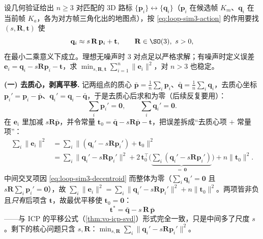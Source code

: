 \begin{derivation}
设几何验证给出 $n\ge 3$ 对匹配的 $3$D 路标 $\{\mathbf p_i\}\leftrightarrow\{\mathbf q_i\}$（$\mathbf p_i$ 在候选帧 $K_m$、$\mathbf q_i$ 在当前帧 $K_a$，各为对方帧三角化出的地图点），按 \cref{eq:loop-sim3-action} 的作用要找 $(s,\mathbf R,\mathbf t)$ 使
\begin{equation}
  \mathbf q_i \approx s\,\mathbf R\,\mathbf p_i+\mathbf t,\qquad \mathbf R\in\SO(3),\ s>0 ,
  \label{eq:loop-sim3-lsq}
\end{equation}
在最小二乘意义下成立。理想无噪声时 $3$ 对点足以严格求解；有噪声时定义误差 $\mathbf e_i=\mathbf q_i-s\mathbf R\mathbf p_i-\mathbf t$，求 $\min_{s,\mathbf R,\mathbf t}\sum_{i=1}^n\lVert\mathbf e_i\rVert^2$，对 $n>3$ 也稳定\cite{horn1987closed}。

\textbf{(一) 去质心，剥离平移.}\;
记两组点的质心 $\bar{\mathbf p}=\tfrac1n\sum_i\mathbf p_i$、$\bar{\mathbf q}=\tfrac1n\sum_i\mathbf q_i$，去质心坐标 $\mathbf p_i'=\mathbf p_i-\bar{\mathbf p}$、$\mathbf q_i'=\mathbf q_i-\bar{\mathbf q}$，于是去质心后求和为零（后续反复要用）：
\begin{equation}
  \sum_i\mathbf p_i'=\mathbf 0,\qquad \sum_i\mathbf q_i'=\mathbf 0 .
  \label{eq:loop-sim3-decentroid}
\end{equation}
在 $\mathbf e_i$ 里加减 $s\mathbf R\bar{\mathbf p}$，并令常量 $\mathbf t_0=\bar{\mathbf q}-s\mathbf R\bar{\mathbf p}-\mathbf t$，把误差拆成“去质心项 $+$ 常量项”：
\begin{equation}
\begin{aligned}
  \sum_i\lVert\mathbf e_i\rVert^2
  &=\sum_i\big\lVert(\mathbf q_i'-s\mathbf R\mathbf p_i')+\mathbf t_0\big\rVert^2\\
  &=\sum_i\lVert\mathbf q_i'-s\mathbf R\mathbf p_i'\rVert^2
   +2\,\mathbf t_0^\top\!\Big(\underbrace{\textstyle\sum_i(\mathbf q_i'-s\mathbf R\mathbf p_i')}_{=\,\mathbf 0}\Big)
   +n\lVert\mathbf t_0\rVert^2 .
\end{aligned}
  \label{eq:loop-sim3-expand}
\end{equation}
中间交叉项因 \cref{eq:loop-sim3-decentroid} 而整体为零（$\sum_i\mathbf q_i'=\mathbf 0$ 且 $s\mathbf R\sum_i\mathbf p_i'=\mathbf 0$），故 $\sum_i\lVert\mathbf e_i\rVert^2=\sum_i\lVert\mathbf q_i'-s\mathbf R\mathbf p_i'\rVert^2+n\lVert\mathbf t_0\rVert^2$。两项皆非负且\emph{只有}后项含 $\mathbf t$，故最优平移使 $\mathbf t_0=\mathbf 0$：
\begin{equation}
  \boxed{\ \mathbf t^\ast=\bar{\mathbf q}-s\,\mathbf R\,\bar{\mathbf p}\ }
  \label{eq:loop-sim3-trans}
\end{equation}
——与 ICP 的平移公式（\cref{thm:vo-icp-svd}）形式完全一致，只是中间多了尺度 $s$。剩下的核心问题只含 $s,\mathbf R$：$\min_{s,\mathbf R}\sum_i\lVert\mathbf q_i'-s\mathbf R\mathbf p_i'\rVert^2$。


\end{derivation}
